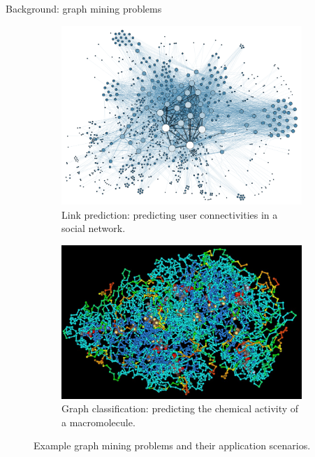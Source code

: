 \documentclass{beamer}
\begin{document}
\begin{frame}{Background: graph mining problems}
	\begin{figure}[H]
		\centering
		\begin{subfigure}{0.49\textwidth}
			\includegraphics[width=\linewidth]{Social_Network_Analysis_Visualization}
			\caption{
				Link prediction: predicting user connectivities in a social network.
			}
			\label{fig:Social_Network_Analysis_Visualization}
		\end{subfigure}
		\begin{subfigure}{0.49\textwidth}
			\includegraphics[width=\textwidth]{ProteinStructure}
			\caption{
				Graph classification: predicting the chemical activity of a macromolecule.
			}
			\label{fig:protein}
		\end{subfigure}
		\caption{
			Example graph mining problems and their application scenarios.
		}
		\label{fig:trainnig}
	\end{figure}
\end{frame}
\end{document}
